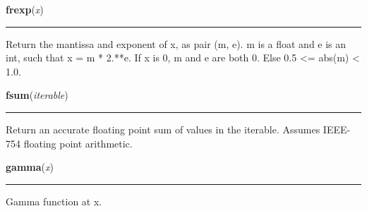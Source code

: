     \label{math:frexp}

    \vspace{0.5ex}

\hspace{.8\funcindent}\begin{boxedminipage}{\funcwidth}

    \raggedright \textbf{frexp}(\textit{x})

    \vspace{-1.5ex}

    \rule{\textwidth}{0.5\fboxrule}
\setlength{\parskip}{2ex}
    Return the mantissa and exponent of x, as pair (m, e). m is a float and
    e is an int, such that x = m * 2.**e. If x is 0, m and e are both 0.  
    Else 0.5 {\textless}= abs(m) {\textless} 1.0.

\setlength{\parskip}{1ex}
    \end{boxedminipage}

    \label{math:fsum}

    \vspace{0.5ex}

\hspace{.8\funcindent}\begin{boxedminipage}{\funcwidth}

    \raggedright \textbf{fsum}(\textit{iterable})

    \vspace{-1.5ex}

    \rule{\textwidth}{0.5\fboxrule}
\setlength{\parskip}{2ex}
    Return an accurate floating point sum of values in the iterable. 
    Assumes IEEE-754 floating point arithmetic.

\setlength{\parskip}{1ex}
    \end{boxedminipage}

    \label{math:gamma}

    \vspace{0.5ex}

\hspace{.8\funcindent}\begin{boxedminipage}{\funcwidth}

    \raggedright \textbf{gamma}(\textit{x})

    \vspace{-1.5ex}

    \rule{\textwidth}{0.5\fboxrule}
\setlength{\parskip}{2ex}
    Gamma function at x.

\setlength{\parskip}{1ex}
    \end{boxedminipage}

